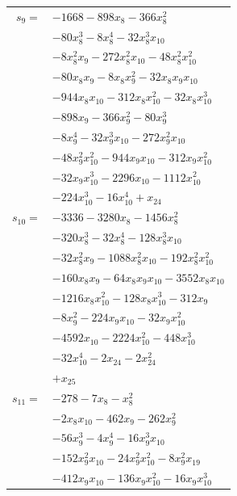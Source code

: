 \begin{longtable}{@{}r@{\;}l@{}}
\(s_{9}=\) & \(\displaystyle -1668 -898x_{8} -366x_{8}^{2}\) \\
 & \(\displaystyle -80x_{8}^{3} -8x_{8}^{4} -32x_{8}^{3}x_{10}\) \\
 & \(\displaystyle -8x_{8}^{2}x_{9} -272x_{8}^{2}x_{10} -48x_{8}^{2}x_{10}^{2}\) \\
 & \(\displaystyle -80x_{8}x_{9} -8x_{8}x_{9}^{2} -32x_{8}x_{9}x_{10}\) \\
 & \(\displaystyle -944x_{8}x_{10} -312x_{8}x_{10}^{2} -32x_{8}x_{10}^{3}\) \\
 & \(\displaystyle -898x_{9} -366x_{9}^{2} -80x_{9}^{3}\) \\
 & \(\displaystyle -8x_{9}^{4} -32x_{9}^{3}x_{10} -272x_{9}^{2}x_{10}\) \\
 & \(\displaystyle -48x_{9}^{2}x_{10}^{2} -944x_{9}x_{10} -312x_{9}x_{10}^{2}\) \\
 & \(\displaystyle -32x_{9}x_{10}^{3} -2296x_{10} -1112x_{10}^{2}\) \\
 & \(\displaystyle -224x_{10}^{3} -16x_{10}^{4} +x_{24}\) \\[3pt]
\(s_{10}=\) & \(\displaystyle -3336 -3280x_{8} -1456x_{8}^{2}\) \\
 & \(\displaystyle -320x_{8}^{3} -32x_{8}^{4} -128x_{8}^{3}x_{10}\) \\
 & \(\displaystyle -32x_{8}^{2}x_{9} -1088x_{8}^{2}x_{10} -192x_{8}^{2}x_{10}^{2}\) \\
 & \(\displaystyle -160x_{8}x_{9} -64x_{8}x_{9}x_{10} -3552x_{8}x_{10}\) \\
 & \(\displaystyle -1216x_{8}x_{10}^{2} -128x_{8}x_{10}^{3} -312x_{9}\) \\
 & \(\displaystyle -8x_{9}^{2} -224x_{9}x_{10} -32x_{9}x_{10}^{2}\) \\
 & \(\displaystyle -4592x_{10} -2224x_{10}^{2} -448x_{10}^{3}\) \\
 & \(\displaystyle -32x_{10}^{4} -2x_{24} -2x_{24}^{2}\) \\
 & \(\displaystyle +x_{25}\) \\[3pt]
\(s_{11}=\) & \(\displaystyle -278 -7x_{8} -x_{8}^{2}\) \\
 & \(\displaystyle -2x_{8}x_{10} -462x_{9} -262x_{9}^{2}\) \\
 & \(\displaystyle -56x_{9}^{3} -4x_{9}^{4} -16x_{9}^{3}x_{10}\) \\
 & \(\displaystyle -152x_{9}^{2}x_{10} -24x_{9}^{2}x_{10}^{2} -8x_{9}^{2}x_{19}\) \\
 & \(\displaystyle -412x_{9}x_{10} -136x_{9}x_{10}^{2} -16x_{9}x_{10}^{3}\) \\

\end{longtable}
